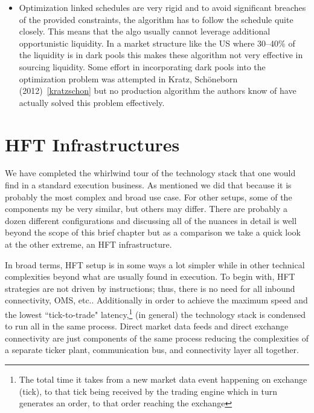 \begin{itemize}
\item Optimization linked schedules are very rigid and to avoid significant breaches of the provided constraints, the algorithm has to follow the schedule quite closely. This means that the algo usually cannot leverage additional opportunistic liquidity. In a market structure like the US where 30--40\% of the liquidity is in dark pools this makes these algorithm not very effective in sourcing liquidity. Some effort in incorporating dark pools into the optimization problem was attempted in Kratz, Sch\"oneborn (2012)~\ref{kratzschon} but no production algorithm the authors know of have actually solved this problem effectively. 
\end{itemize}



\section{HFT Infrastructures}

We have completed the whirlwind tour of the technology stack that one would find in a standard execution business. As mentioned we did  that because it is probably the most complex and broad use case. For other setups, some of the components my be very similar, but others may differ. There are probably a dozen different configurations and discussing all of the nuances in detail is well beyond the scope of this brief chapter but as a comparison we take a quick look at the other extreme, an HFT infrastructure.


In broad terms, HFT setup is in some ways a lot simpler while in other technical complexities beyond what are usually found in execution. To begin with, HFT strategies are not driven by instructions; thus, there is no need for all inbound connectivity, OMS, etc..  Additionally in order to achieve the maximum speed and the lowest  ``tick-to-trade" latency,\footnote{The total time it takes from a new market data event happening on exchange (tick), to that tick being received by the trading engine which in turn generates an order, to that order reaching the exchange} (in general) the technology stack is condensed to run all in the same process. Direct market data feeds and direct exchange connectivity are just components of the same process reducing the complexities of a separate ticker plant, communication bus, and connectivity layer all together. 


